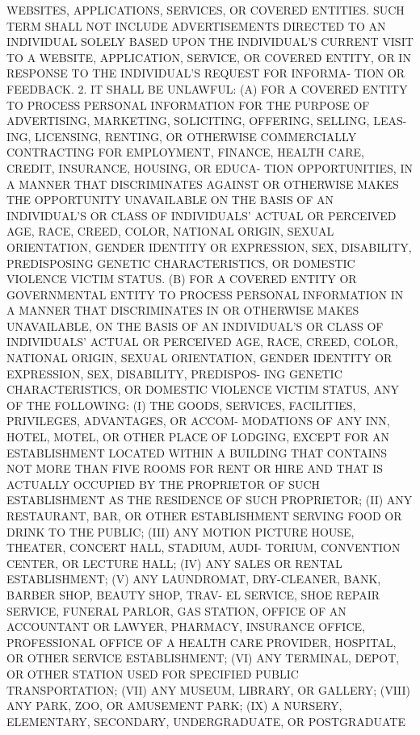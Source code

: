  WEBSITES, APPLICATIONS, SERVICES, OR COVERED ENTITIES. SUCH  TERM  SHALL
 NOT  INCLUDE  ADVERTISEMENTS DIRECTED TO AN INDIVIDUAL SOLELY BASED UPON
 THE INDIVIDUAL'S CURRENT VISIT TO A WEBSITE,  APPLICATION,  SERVICE,  OR
 COVERED  ENTITY, OR IN RESPONSE TO THE INDIVIDUAL'S REQUEST FOR INFORMA-
 TION OR FEEDBACK.
   2. IT SHALL BE UNLAWFUL:
   (A) FOR A COVERED ENTITY  TO  PROCESS  PERSONAL  INFORMATION  FOR  THE
 PURPOSE  OF ADVERTISING, MARKETING, SOLICITING, OFFERING, SELLING, LEAS-
 ING, LICENSING,  RENTING,  OR  OTHERWISE  COMMERCIALLY  CONTRACTING  FOR
 EMPLOYMENT,  FINANCE, HEALTH CARE, CREDIT, INSURANCE, HOUSING, OR EDUCA-
 TION OPPORTUNITIES, IN A MANNER THAT DISCRIMINATES AGAINST OR  OTHERWISE
 MAKES  THE  OPPORTUNITY  UNAVAILABLE  ON THE BASIS OF AN INDIVIDUAL'S OR
 CLASS OF INDIVIDUALS' ACTUAL  OR  PERCEIVED  AGE,  RACE,  CREED,  COLOR,
 NATIONAL ORIGIN, SEXUAL ORIENTATION, GENDER IDENTITY OR EXPRESSION, SEX,
 DISABILITY,  PREDISPOSING  GENETIC CHARACTERISTICS, OR DOMESTIC VIOLENCE
 VICTIM STATUS.
   (B) FOR A COVERED ENTITY OR GOVERNMENTAL ENTITY  TO  PROCESS  PERSONAL
 INFORMATION  IN  A  MANNER  THAT  DISCRIMINATES  IN  OR  OTHERWISE MAKES
 UNAVAILABLE, ON THE BASIS OF AN INDIVIDUAL'S OR  CLASS  OF  INDIVIDUALS'
 ACTUAL  OR  PERCEIVED  AGE,  RACE, CREED, COLOR, NATIONAL ORIGIN, SEXUAL
 ORIENTATION, GENDER IDENTITY OR EXPRESSION, SEX, DISABILITY,  PREDISPOS-
 ING  GENETIC CHARACTERISTICS, OR DOMESTIC VIOLENCE VICTIM STATUS, ANY OF
 THE FOLLOWING:
   (I) THE GOODS, SERVICES, FACILITIES, PRIVILEGES, ADVANTAGES, OR ACCOM-
 MODATIONS OF ANY INN, HOTEL, MOTEL, OR OTHER PLACE  OF  LODGING,  EXCEPT
 FOR  AN  ESTABLISHMENT  LOCATED WITHIN A BUILDING THAT CONTAINS NOT MORE
 THAN FIVE ROOMS FOR RENT OR HIRE AND THAT IS ACTUALLY  OCCUPIED  BY  THE
 PROPRIETOR OF SUCH ESTABLISHMENT AS THE RESIDENCE OF SUCH PROPRIETOR;
   (II) ANY RESTAURANT, BAR, OR OTHER ESTABLISHMENT SERVING FOOD OR DRINK
 TO THE PUBLIC;
   (III)  ANY MOTION PICTURE HOUSE, THEATER, CONCERT HALL, STADIUM, AUDI-
 TORIUM, CONVENTION CENTER, OR LECTURE HALL;
   (IV) ANY SALES OR RENTAL ESTABLISHMENT;
   (V) ANY LAUNDROMAT, DRY-CLEANER, BANK, BARBER SHOP, BEAUTY SHOP, TRAV-
 EL SERVICE, SHOE REPAIR SERVICE, FUNERAL PARLOR, GAS STATION, OFFICE  OF
 AN ACCOUNTANT OR LAWYER, PHARMACY, INSURANCE OFFICE, PROFESSIONAL OFFICE
 OF A HEALTH CARE PROVIDER, HOSPITAL, OR OTHER SERVICE ESTABLISHMENT;
   (VI)  ANY  TERMINAL, DEPOT, OR OTHER STATION USED FOR SPECIFIED PUBLIC
 TRANSPORTATION;
   (VII) ANY MUSEUM, LIBRARY, OR GALLERY;
   (VIII) ANY PARK, ZOO, OR AMUSEMENT PARK;
   (IX) A NURSERY, ELEMENTARY, SECONDARY, UNDERGRADUATE, OR  POSTGRADUATE
